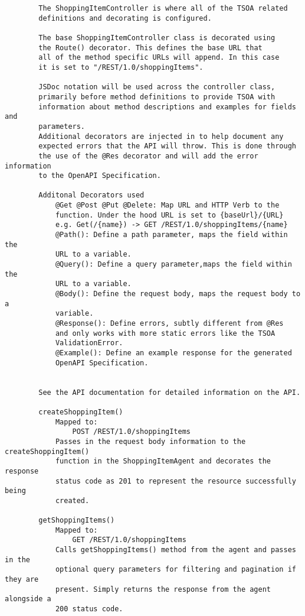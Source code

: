 \begin{verbatim}
        The ShoppingItemController is where all of the TSOA related
        definitions and decorating is configured.
        
        The base ShoppingItemController class is decorated using
        the Route() decorator. This defines the base URL that
        all of the method specific URLs will append. In this case
        it is set to "/REST/1.0/shoppingItems".
        
        JSDoc notation will be used across the controller class,
        primarily before method definitions to provide TSOA with
        information about method descriptions and examples for fields and
        parameters.
        Additional decorators are injected in to help document any
        expected errors that the API will throw. This is done through
        the use of the @Res decorator and will add the error information
        to the OpenAPI Specification.
        
        Additonal Decorators used
            @Get @Post @Put @Delete: Map URL and HTTP Verb to the
            function. Under the hood URL is set to {baseUrl}/{URL}
            e.g. Get(/{name}) -> GET /REST/1.0/shoppingItems/{name}
            @Path(): Define a path parameter, maps the field within the
            URL to a variable.
            @Query(): Define a query parameter,maps the field within the
            URL to a variable.
            @Body(): Define the request body, maps the request body to a 
            variable.
            @Response(): Define errors, subtly different from @Res
            and only works with more static errors like the TSOA
            ValidationError.
            @Example(): Define an example response for the generated
            OpenAPI Specification.
            
        
        See the API documentation for detailed information on the API.
        
        createShoppingItem()
            Mapped to:
                POST /REST/1.0/shoppingItems
            Passes in the request body information to the createShoppingItem()
            function in the ShoppingItemAgent and decorates the response
            status code as 201 to represent the resource successfully being
            created.
        
        getShoppingItems()
            Mapped to:
                GET /REST/1.0/shoppingItems
            Calls getShoppingItems() method from the agent and passes in the
            optional query parameters for filtering and pagination if they are
            present. Simply returns the response from the agent alongside a
            200 status code.
        

\end{verbatim}
